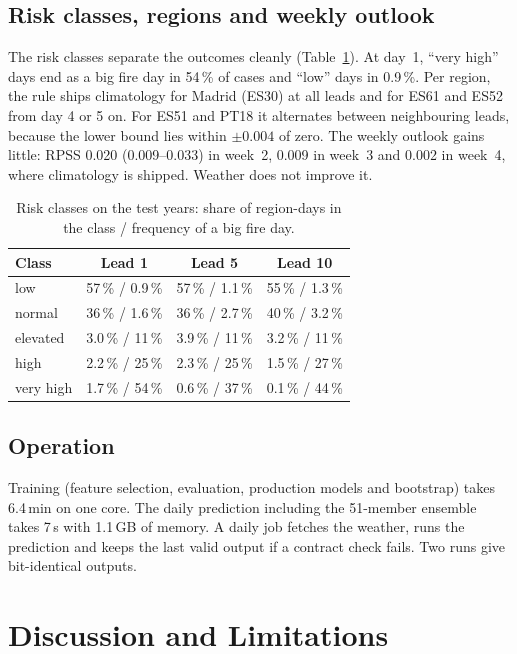 \documentclass[conference,a4paper]{IEEEtran}
\begin{document}
\subsection{Risk classes, regions and weekly outlook}
The risk classes separate the outcomes cleanly (Table~\ref{tab:risk}). At day~1, ``very high'' days end as a big
fire day in 54\,\% of cases and ``low'' days in 0.9\,\%. Per region, the rule ships climatology for Madrid (ES30) at all
leads and for ES61 and ES52 from day 4 or 5 on. For ES51 and PT18 it alternates between neighbouring leads, because the
lower bound lies within $\pm 0.004$ of zero. The weekly outlook gains little: RPSS 0.020 (0.009--0.033) in week~2,
0.009 in week~3 and 0.002 in week~4, where climatology is shipped. Weather does not improve it.

\begin{table}[t]
\centering
\caption{Risk classes on the test years: share of region-days in the class / frequency of a big fire day.}
\label{tab:risk}
\footnotesize
\begin{tabular}{@{}lccc@{}}
\toprule
Class & Lead 1 & Lead 5 & Lead 10 \\
\midrule
low       & 57\,\% / 0.9\,\% & 57\,\% / 1.1\,\% & 55\,\% / 1.3\,\% \\
normal    & 36\,\% / 1.6\,\% & 36\,\% / 2.7\,\% & 40\,\% / 3.2\,\% \\
elevated  & 3.0\,\% / 11\,\% & 3.9\,\% / 11\,\% & 3.2\,\% / 11\,\% \\
high      & 2.2\,\% / 25\,\% & 2.3\,\% / 25\,\% & 1.5\,\% / 27\,\% \\
very high & 1.7\,\% / 54\,\% & 0.6\,\% / 37\,\% & 0.1\,\% / 44\,\% \\
\bottomrule
\end{tabular}
\end{table}

\subsection{Operation}
Training (feature selection, evaluation, production models and bootstrap) takes 6.4\,min on one core. The daily
prediction including the 51-member ensemble takes 7\,s with 1.1\,GB of memory. A daily job fetches the weather, runs
the prediction and keeps the last valid output if a contract check fails. Two runs give bit-identical outputs.

\section{Discussion and Limitations}
\end{document}
